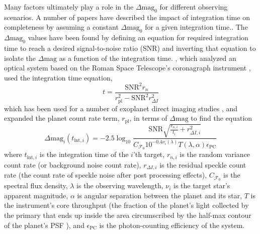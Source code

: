 Many factors ultimately play a role in the $\Delta\textrm{mag}_0$ for different
observing scenarios. A number of papers have described the impact of
integration time on completeness by assuming a constant $\Delta\textrm{mag}_0$
for a given integration time.\citep{hunyadiSingleVisitCompleteness2005,
brownNewCompletenessMethods2010, starkMaximizingExoEarthCandidate2014,
keithlyOptimalScheduling2020}. The $\Delta\textrm{mag}_0$ values have been
found by defining an equation for required integration time to reach a desired
signal-to-noise ratio (SNR) and inverting that equation to isolate the
$\Delta\textrm{mag}$ as a function of the integration time.
\citet{keithlyOptimalScheduling2020}, which analyzed an optical system based on
the Roman Space Telescope's coronagraph instrument \citep{Nemati2014}, used the
integration time equation,
\begin{equation}
  t = \frac{\textrm{SNR}^2 r_n}{r^2_\textrm{pl} - \textrm{SNR}^2 r^2_{\Delta I}}
  \label{eq:2020t}
\end{equation}
which has been used for a number of exoplanet direct imaging studies
\citep{nematiSensitivityWFIRST2017, delacroixScienceYield2016,
savranskyMultimissionModeling2017}, and expanded the planet count rate term,
$r_\textrm{pl}$, in terms of $\Delta\textrm{mag}$ to find the 
equation
\begin{equation}
  \Delta\textrm{mag}_i(t_{\textrm{int},i}) = -2.5 \log_{10} \frac{\textrm{SNR} \sqrt{\frac{r_{n,i}
    }{t_i} + r^2_{\Delta I, i} }}{C_{\mathcal{F}_0} 10^{-0.4 \nu_i (\lambda)}
T(\lambda, \alpha) \epsilon_{\textrm{PC}}}
  \label{eq:dean_dmag}
\end{equation}
where $t_{\textrm{int},i}$ is the integration time of the $i$'th target,
$r_{n,i}$ is the random variance count rate (or background noise count rate),
$r_{\Delta I,i}$ is the residual speckle count rate (the count rate of speckle noise after post processing effects),
$C_{\mathcal{F}_0}$ is the spectral flux density,
$\lambda$ is the observing wavelength,
$\nu_i$ is the target star's apparent magnitude,
$\alpha$ is angular separation between the planet and its star,
$T$ is the instrument's core throughput (the fraction of the planet's light collected by
the primary that ends up inside the area circumscribed by the half-max contour
of the planet's PSF \citep{Nemati2020a}), and $\epsilon_{\textrm{PC}}$ is the
photon-counting efficiency of the system.

